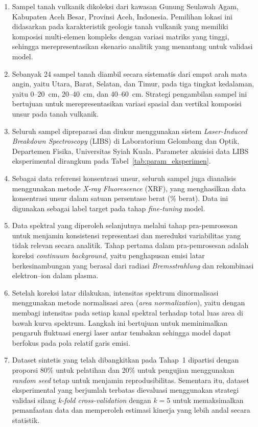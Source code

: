 \begin{enumerate}
    \item Sampel tanah vulkanik dikoleksi dari kawasan Gunung Seulawah Agam, Kabupaten Aceh Besar, Provinsi Aceh, Indonesia. Pemilihan lokasi ini didasarkan pada karakteristik geologis tanah vulkanik yang memiliki komposisi multi-elemen kompleks dengan variasi matriks yang tinggi, sehingga merepresentasikan skenario analitik yang menantang untuk validasi model.

    \item Sebanyak 24 sampel tanah diambil secara sistematis dari empat arah mata angin, yaitu Utara, Barat, Selatan, dan Timur, pada tiga tingkat kedalaman, yaitu 0--20~cm, 20--40~cm, dan 40--60~cm. Strategi pengambilan sampel ini bertujuan untuk merepresentasikan variasi spasial dan vertikal komposisi unsur pada tanah vulkanik.

    \item Seluruh sampel dipreparasi dan diukur menggunakan sistem \textit{Laser-Induced Breakdown Spectroscopy} (LIBS) di Laboratorium Gelombang dan Optik, Departemen Fisika, Universitas Syiah Kuala. Parameter akuisisi data LIBS eksperimental dirangkum pada Tabel~\ref{tab:param_eksperimen}.

    \item Sebagai data referensi konsentrasi unsur, seluruh sampel juga dianalisis menggunakan metode \textit{X-ray Fluorescence} (XRF), yang menghasilkan data konsentrasi unsur dalam satuan persentase berat (\% berat). Data ini digunakan sebagai label target pada tahap \textit{fine-tuning} model.

    \item Data spektral yang diperoleh selanjutnya melalui tahap pra-pemrosesan untuk menjamin konsistensi representasi dan mereduksi variabilitas yang tidak relevan secara analitik. Tahap pertama dalam pra-pemrosesan adalah koreksi \textit{continuum background}, yaitu penghapusan emisi latar berkesinambungan yang berasal dari radiasi \textit{Bremsstrahlung} dan rekombinasi elektron--ion dalam plasma.

    \item Setelah koreksi latar dilakukan, intensitas spektrum dinormalisasi menggunakan metode normalisasi area (\textit{area normalization}), yaitu dengan membagi intensitas pada setiap kanal spektral terhadap total luas area di bawah kurva spektrum. Langkah ini bertujuan untuk meminimalkan pengaruh fluktuasi energi laser antar tembakan sehingga model dapat berfokus pada pola relatif garis emisi.

    \item Dataset sintetis yang telah dibangkitkan pada Tahap~1 dipartisi dengan proporsi 80\% untuk pelatihan dan 20\% untuk pengujian menggunakan \textit{random seed} tetap untuk menjamin reprodusibilitas. Sementara itu, dataset eksperimental yang berjumlah terbatas dievaluasi menggunakan strategi validasi silang \textit{k-fold cross-validation} dengan $k = 5$ untuk memaksimalkan pemanfaatan data dan memperoleh estimasi kinerja yang lebih andal secara statistik.
\end{enumerate}

